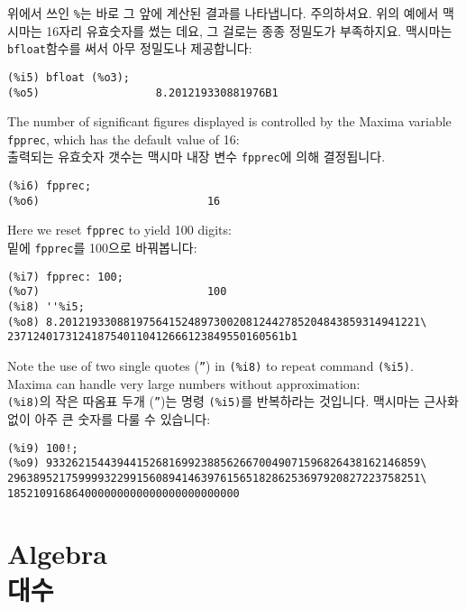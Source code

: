 \documentclass[a4paper,12pt]{article}
\begin{document}
위에서 쓰인 \verb+%+는 바로 그 앞에 계산된 결과를 나타냅니다. 주의하셔요. 위의 예에서 맥시마는 16자리
유효숫자를 썼는 데요, 그 걸로는 종종 정밀도가 부족하지요. 맥시마는 {\tt bfloat}함수를 써서 아무 정밀도나
제공합니다:
\begin{verbatim}
(%i5) bfloat (%o3);
(%o5)                  8.201219330881976B1
\end{verbatim}
The number of significant figures displayed is controlled by the 
Maxima variable {\tt fpprec}, which has the default value of 16: \\
출력되는 유효숫자 갯수는 맥시마 내장 변수 {\tt fpprec}에 의해 결정됩니다.
\begin{verbatim}
(%i6) fpprec;
(%o6)                          16
\end{verbatim}
Here we reset {\tt fpprec} to yield 100 digits: \\
밑에 {\tt fpprec}를 100으로 바꿔봅니다:
\begin{verbatim}
(%i7) fpprec: 100;
(%o7)                          100
(%i8) ''%i5;
(%o8) 8.20121933088197564152489730020812442785204843859314941221\
2371240173124187540110412666123849550160561b1
\end{verbatim}
Note the use of two single quotes ({\tt ''}) in {\tt (\%i8)} to repeat 
command {\tt (\%i5)}.  Maxima can handle very large numbers without 
approximation: \\
{\tt (\%i8)}의 작은 따옴표 두개 ({\tt ''})는 명령 {\tt (\%i5)}를 반복하라는 것입니다.
맥시마는 근사화 없이 아주 큰 숫자를 다룰 수 있습니다: 
\begin{verbatim}
(%i9) 100!;
(%o9) 9332621544394415268169923885626670049071596826438162146859\
2963895217599993229915608941463976156518286253697920827223758251\
185210916864000000000000000000000000
\end{verbatim}

\section{Algebra\\대수  \label{sec:algebra}}
\end{document}
